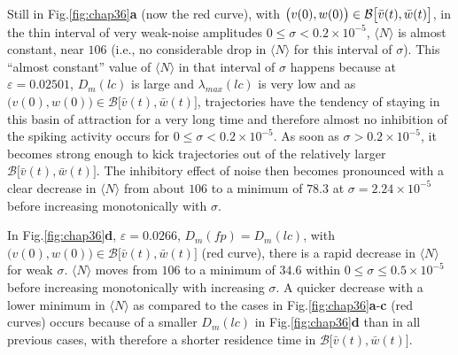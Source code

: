 Still in Fig.\ref{fig:chap36}\textbf{a} (now the red curve),
with $\big(v(0),w(0)\big)\\\in\mathcal{B}\big[\bar{v}(t),\bar{w}(t)\big]$, 
in the thin interval of very weak-noise amplitudes
$0\leq\sigma<0.2\times10^{-5}$, $\langle N\rangle$ is almost constant, near
$106$ (i.e., no considerable drop in $\langle N\rangle$ for this interval of
$\sigma$). This ``almost constant'' value of $\langle N\rangle$ in 
that interval of $\sigma$ happens because at
$\varepsilon=0.02501$, $D_{m}(lc)$ is large and
$\lambda_{max}(lc)$ is very low and as
$\big(v(0),w(0)\big)\in\mathcal{B}\big[\bar{v}(t),\bar{w}(t)\big]$,
trajectories have the tendency of staying in this basin of attraction for a very
long time and therefore almost no inhibition of the spiking
activity occurs for $0\leq\sigma<0.2\times10^{-5}$. As soon as
$\sigma>0.2\times10^{-5}$, it becomes strong enough to kick
trajectories out of the relatively larger
$\mathcal{B}\big[\bar{v}(t),\bar{w}(t)\big]$. The inhibitory effect
of noise then becomes pronounced with a clear decrease in $\langle N\rangle$
from about $106$ to a minimum of $78.3$ at
$\sigma=2.24\times10^{-5}$ before increasing monotonically with $\sigma$.

In Fig.\ref{fig:chap36}\textbf{d}, $\varepsilon=0.0266$, $D_{m}(fp)=D_{m}(lc)$, with
$\big(v(0),w(0)\big)\in\mathcal{B}\big[\bar{v}(t),\bar{w}(t)\big]$
(red curve), there is a rapid decrease in $\langle N\rangle$ for weak $\sigma$.
$\langle N\rangle$ moves from $106$ to a minimum of $34.6$ within
$0\leq\sigma\leq0.5\times10^{-5}$ before increasing monotonically
with increasing $\sigma$. A quicker decrease with a lower minimum
in $\langle N\rangle$ as compared to the cases in Fig.\ref{fig:chap36}\textbf{a}-\textbf{c} 
(red curves) occurs
because of a smaller $D_{m}(lc)$ in Fig.\ref{fig:chap36}\textbf{d} than in all 
previous cases, with
therefore a shorter residence time in
$\mathcal{B}\big[\bar{v}(t),\bar{w}(t)\big]$.

